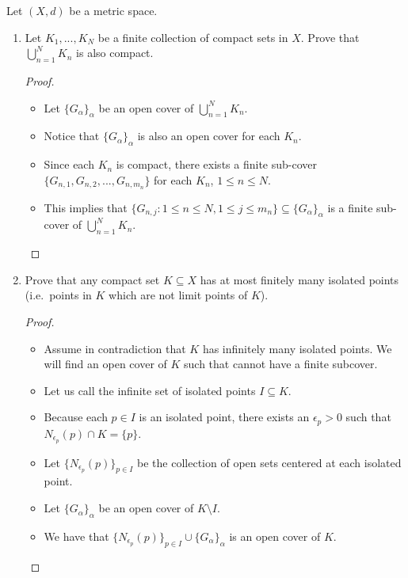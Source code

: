 \documentclass[10pt]{article}
\newenvironment{problem}[2][Problem]{\begin{trivlist}
\item[\hskip \labelsep {\bfseries #1}\hskip \labelsep {\bfseries #2.}]}{\end{trivlist}}
\begin{document}
\begin{problem}{2}
	Let $ (X,d) $ be a metric space. 
	\begin{enumerate}%
		\item Let $ K_1,...,K_N $ be a finite collection of compact sets in $ X $. Prove that $ \bigcup_{n=1}^N K_n $ is also compact.
            \begin{proof}
                \hfill
                \begin{itemize}
                    \item Let $\{G_\alpha\}_{\alpha}$ be an open cover of $\bigcup_{n=1}^N K_n$.
                    \item Notice that $\{G_\alpha\}_{\alpha}$ is also an open cover for each $K_n$.
                    \item Since each $K_n$ is compact, there exists a finite sub-cover $\{G_{n,1}, G_{n,2}, ..., G_{n,m_n}\}$ for each $K_n$, $1 \leq n \leq N$.
                    \item This implies that $\{G_{n,j} : 1 \leq n \leq N, 1 \leq j \leq m_n\}\subseteq \{G_\alpha\}_\alpha$ is a finite sub-cover of $\bigcup_{n=1}^N K_n$.
                \end{itemize}
            \end{proof}
		\item Prove that any compact set $ K \subseteq X $ has at most finitely many isolated points (i.e.~points in $ K $ which are not limit points of $ K $).
            \begin{proof}
                \hfill
                \begin{itemize}
                    \item Assume in contradiction that $K$ has infinitely many isolated points. We will find an open cover of $K$ such that cannot have a finite subcover.
                    \item Let us call the infinite set of isolated points $I \subseteq K$.
                    \item Because each $p \in I$ is an isolated point, there exists an $\epsilon_p > 0$ such that $N_{\epsilon_p}(p) \cap K = \{p\}$.
                    \item Let $\{N_{\epsilon_p}(p)\}_{p \in I}$ be the collection of open sets centered at each isolated point.
                    \item Let $\{G_\alpha\}_{\alpha}$ be an open cover of $K \setminus I$.
                    \item We have that $\{N_{\epsilon_p}(p)\}_{p \in I} \cup \{G_\alpha\}_{\alpha}$ is an open cover of $K$.

\end{itemize}
\end{proof}
\end{enumerate}
\end{problem}
\end{document}
